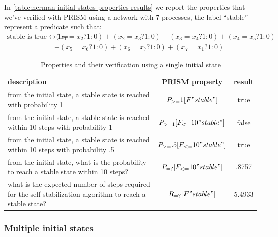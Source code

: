 In \autoref{table:herman-initial-states-properties-results} we report
the properties that we've verified with PRISM using a network with 7
processes, the label ``stable'' represent a predicate such that:
\begin{displaymath}
  \begin{split}
    \text{stable is true} \leftrightarrow 1 = &(x_1=x_2?1:0)+(x_2=x_3?1:0)+(x_3=x_4?1:0)+(x_4=x_5?1:0)\\
    &+(x_5=x_6?1:0)+(x_6=x_7?1:0)+(x_7=x_1?1:0)
  \end{split}
\end{displaymath}


\begin{table}[ht]
  \begin{center}
    \begin{tabular}{p{5cm}cc}
      \hline
      description & PRISM property  & result \\
      \hline     
      from the initial state, a stable state is reached with
      probability 1 & $P_{>=}1 [ F "stable" ]$ & true \\
      from the initial state, a stable state is reached within 10
      steps with probability 1 & $P_{>=1} [ F_{<=}10 "stable" ]$ & false\\
      from the initial state, a stable state is reached within 10
      steps with probability .5 & $P_{>=}.5 [ F_{<=}10 "stable" ]$ & true\\
      from the initial state, what is the probability to reach a
      stable state within 10 steps? & $P_{=?} [ F_{<=}10 "stable" ]$ & .8757\\
      what is the expected number of steps required for the
      self-stabilization algorithm to reach a stable state? & $R_{=?} [ F
      "stable" ]$ & 5.4933\\
      \hline
    \end{tabular}
    \caption{Properties and their verification using a single initial
      state}
    \label{table:herman-initial-states-properties-results}
  \end{center}
\end{table}

\subsubsection{Multiple initial states}


